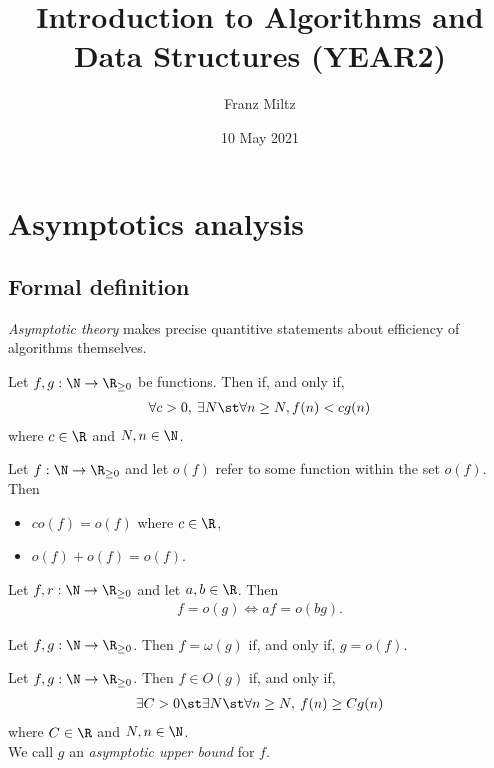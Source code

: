 \documentclass{article}
\begin{document}
\title{Introduction to Algorithms and Data Structures (YEAR2)}
\author{Franz Miltz}
\date{10 May 2021}
\maketitle
\setcounter{tocdepth}{2}
\tableofcontents
\pagebreak


\section{Asymptotics analysis}

\subsection{Formal definition}

\emph{Asymptotic theory} makes precise quantitive statements about efficiency of algorithms themselves.
\begin{definition}
	Let $f,g:\N\to\R_{\geq 0}$ be functions. Then
	 if, and only if, 
	\begin{align*}
		\forall c>0,\:\exists N\st \forall n \geq N, f(n)<cg(n)
	\end{align*}
	where $c\in\R$ and $N,n\in\N$.
\end{definition}
\begin{theorem}
	Let $f:\N\to\R_{\geq 0}$ and let $o(f)$ refer to some
	function within the set $o(f)$. Then
	\begin{itemize}
		\item $co(f)=o(f)$ where $c\in\R$,
		\item $o(f) + o(f) = o(f)$.
	\end{itemize}
\end{theorem}
\begin{theorem}
	Let $f,r:\N\to\R_{\geq 0}$ and let $a,b\in\R$. Then
	\begin{align*}
		f=o(g) \Leftrightarrow af=o(bg).	
	\end{align*}
\end{theorem}
\begin{definition}
	Let $f,g:\N\to\R_{\geq 0}$. Then $f=\omega(g)$ if, and only if, $g=o(f)$.
\end{definition}
\begin{definition}
	Let $f,g:\N\to\R_{\geq 0}$. Then $f\in O(g)$ if, and only if,
	\begin{align*}
		\exists C > 0\st \exists N \st \forall n \geq N,\: f(n) \geq Cg(n)
	\end{align*}
	where $C\in\R$ and $N,n\in\N$.\\
	We call $g$ an \emph{asymptotic upper bound} for $f$.
\end{definition}
\end{document}

